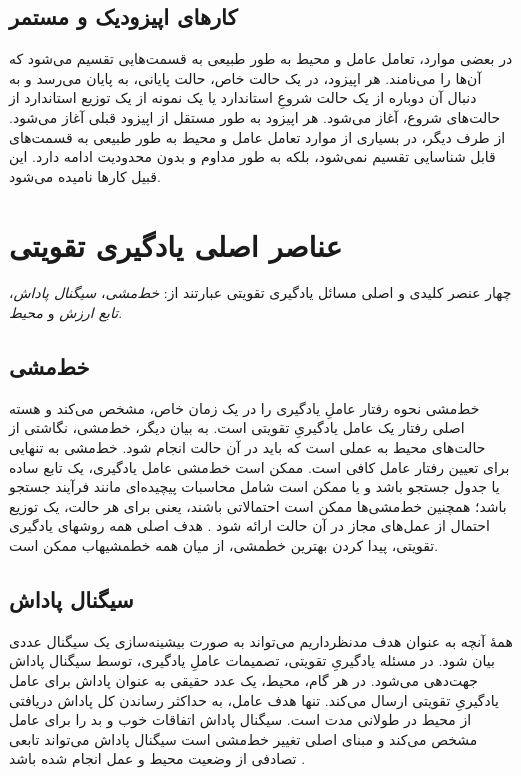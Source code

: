 \subsection{کارهای اپیزودیک و مستمر}
در بعضی موارد، تعامل عامل و محیط به طور طبیعی به قسمت‌هایی تقسیم می‌شود که آن‌ها را 
\textit{}
می‌نامند. هر اپیزود، در یک حالت خاص، حالت پایانی، به پایان می‌رسد و به دنبال آن دوباره از یک حالت شروعِ استاندارد یا یک نمونه از یک توزیع استاندارد از حالت‌های شروع، آغاز می‌شود. هر اپیزود به طور مستقل از اپیزود قبلی آغاز می‌شود.
از طرف دیگر، در بسیاری از موارد تعامل عامل و محیط به طور طبیعی به قسمت‌های قابل شناسایی تقسیم نمی‌شود، بلکه به طور مداوم و بدون محدودیت ادامه دارد. این قبیل کارها 
\textit{
}
 نامیده می‌شود.
\section{عناصر اصلی یادگیری تقویتی}
چهار عنصر کلیدی و اصلی مسائل یادگیری تقویتی عبارتند از:
\textit{خط‌مشی}، 
\textit{سیگنال پاداش}،
\textit{تابع ارزش} 
و
\textit{محیط}.
\subsection{خط‌مشی}
خط‌مشی 
نحوه رفتار عاملِ یادگیری را در یک زمان خاص، مشخص می‌کند و هسته اصلی رفتار یک عامل یادگیریِ تقویتی است. به بیان دیگر، خط‌مشی، نگاشتی از حالت‌های محیط به عملی است که باید در آن حالت انجام شود. خط‌مشی به تنهایی برای تعیین رفتار عامل کافی است. ممکن است
خط‌مشی عامل یادگیری، یک تابع ساده یا جدول جستجو باشد و یا ممکن است شامل محاسبات پیچیده‌ای مانند فرآیند جستجو باشد؛ همچنین
خط‌مشی‌ها ممکن است احتمالاتی باشند، یعنی برای هر حالت، یک توزیع احتمال از عمل‌های مجاز در آن حالت ارائه شود
\cite{suttonbook}.
هدف اصلی همه روش\nf های یادگیری تقویتی، پیدا کردن بهترین خط\nf مشی، از میان 
همه خط\nf مشی\nf هاب ممکن است.
\subsection{سیگنال پاداش}
همهٔ آنچه به عنوان هدف مدنظرداریم می‌تواند به صورت بیشینه‌سازی  یک سیگنال عددی بیان شود. در مسئله یادگیریِ تقویتی، تصمیمات عاملِ یادگیری، توسط سیگنال پاداش جهت‌دهی می‌شود. در هر گام، محیط، یک عدد حقیقی به عنوان پاداش برای عامل یادگیریِ تقویتی ارسال می‌کند. تنها هدف عامل، به حداکثر رساندن کل پاداش دریافتی از محیط در طولانی مدت است. سیگنال پاداش اتفاقات خوب و بد را برای عامل مشخص می‌کند و مبنای اصلی تغییر خط‌مشی است
سیگنال پاداش می‌تواند تابعی تصادفی از وضعیت محیط و عمل انجام شده باشد
\cite{suttonbook}.

